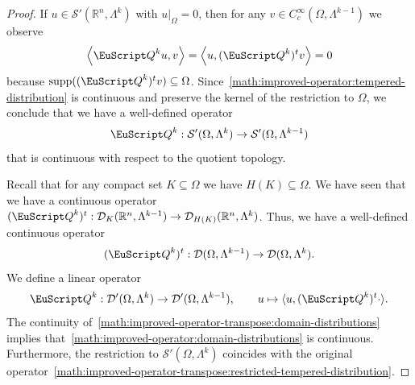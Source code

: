 \documentclass[10pt,a4paper]{amsart}
\theoremstyle{definition}
\theoremstyle{remark}
\numberwithin{equation}{section}
\newcommand{\bbR}{{\mathbb R}}
\newcommand{\calD}{{\mathcal D}}
\newcommand{\calS}{{\mathcal S}}
\newcommand{\euQ}{{\EuScript Q}}
\renewcommand{\restriction}{|}
\newcommand{\supp}{\operatorname{supp}}
\newcommand{\Domain}{{\Omega}}
\newcommand{\Alt}[1]{\Lambda^{#1}}
\begin{document}
\begin{proof}
    If $u \in \calS'(\bbR^{n},\Alt{k})$ with $u \restriction_{\Domain} = 0$, 
    then for any $v \in C^{\infty}_{c}(\Domain,\Alt{k-1})$ we observe 
    \begin{align*}
        \left\langle 
        {\euQ}^{k} u, v
        \right\rangle 
        =
        \left\langle 
        u, ({\euQ}^{k})^{t} v
        \right\rangle 
        =
        0
    \end{align*}
    because $\supp( ({\euQ}^{k})^{t} v ) \subseteq \Domain$. 
    Since~\eqref{math:improved-operator:tempered-distribution} is continuous and preserve the kernel of the restriction to $\Domain$,
    we conclude that we have a well-defined operator 
    \begin{align}\label{math:improved-operator-transpose:restricted-tempered-distribution}
        {\euQ}^{k} : \calS'(\Domain,\Alt{k}) \to \calS'(\Domain,\Alt{k-1})
    \end{align}
    that is continuous with respect to the quotient topology. 
    
    
    
    


    Recall that for any compact set $K \subseteq \Domain$ we have $H(K) \subseteq \Domain$.
    We have seen that we have a continuous operator 
    $({\euQ}^{k})^{t} : \calD_{K}(\bbR^{n},\Alt{k-1}) \to \calD_{H(K)}(\bbR^{n},\Alt{k})$.
    Thus, we have a well-defined continuous operator 
    \begin{align}\label{math:improved-operator-transpose:domain-distributions}
        ({\euQ}^{k})^{t} : \calD(\Domain,\Alt{k-1}) \to \calD(\Domain,\Alt{k})
        .
    \end{align}
    We define a linear operator 
    \begin{align}\label{math:improved-operator:domain-distributions}
        {\euQ}^{k} : \calD'(\Domain,\Alt{k}) \to \calD'(\Domain,\Alt{k-1}), \qquad u \mapsto \langle u, ({\euQ}^{k})^{t} \cdot \rangle
        .
    \end{align}
    The continuity of~\eqref{math:improved-operator-transpose:domain-distributions} implies that~\eqref{math:improved-operator:domain-distributions}
    is continuous.
    Furthermore, the restriction to $\calS'(\Domain,\Alt{k})$ coincides with the original operator~\eqref{math:improved-operator-transpose:restricted-tempered-distribution}. 
    
    
    
    
    

\end{proof}
\end{document}
